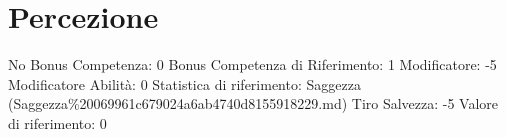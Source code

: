 \section{Percezione}\label{percezione}

\begin{description}
\tightlist
\item[Tags: ABI]
No Bonus Competenza: 0 Bonus Competenza di Riferimento: 1 Modificatore:
-5 Modificatore Abilità: 0 Statistica di riferimento: Saggezza
(Saggezza\%20069961c679024a6ab4740d8155918229.md) Tiro Salvezza: -5
Valore di riferimento: 0
\end{description}
